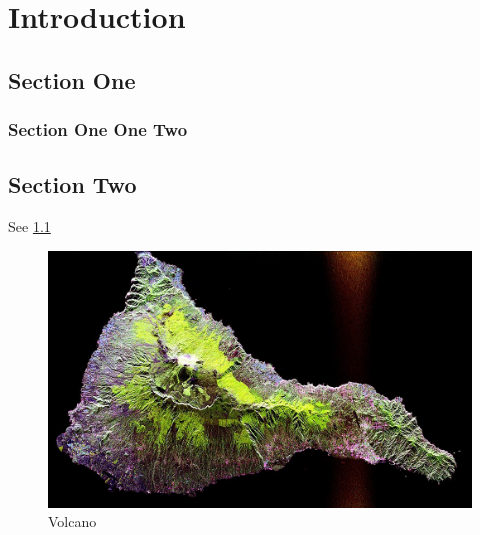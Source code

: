 \chapter{Introduction}

\section{Section One}

\lipsum[1-1] \cite{ValacichModernDesign}

\subsection{Section One One Two}
\lipsum[2-2]

\section{Section Two}

\lipsum[1-2] See \cref{fig:volcano}

\begin{figure}[htbp]
    \centering
    \includegraphics[width=0.5\linewidth]{images/volcano.JPG}
    \caption{Volcano}
    \label{fig:volcano}
\end{figure}